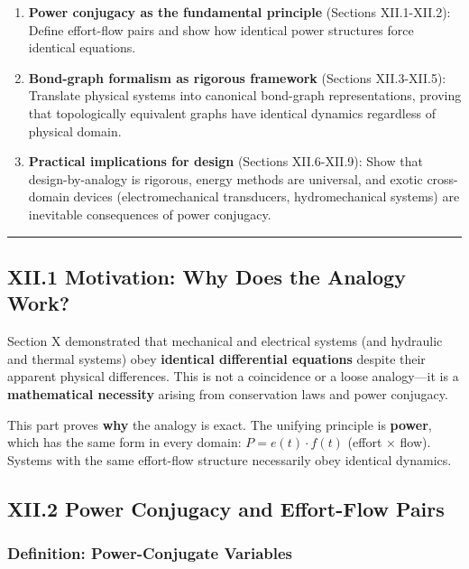 \documentclass[
]{article}
\begin{document}
\begin{enumerate}
\def\labelenumi{\arabic{enumi}.}
\item
  \textbf{Power conjugacy as the fundamental principle} (Sections
  XII.1-XII.2): Define effort-flow pairs and show how identical power
  structures force identical equations.
\item
  \textbf{Bond-graph formalism as rigorous framework} (Sections
  XII.3-XII.5): Translate physical systems into canonical bond-graph
  representations, proving that topologically equivalent graphs have
  identical dynamics regardless of physical domain.
\item
  \textbf{Practical implications for design} (Sections XII.6-XII.9):
  Show that design-by-analogy is rigorous, energy methods are universal,
  and exotic cross-domain devices (electromechanical transducers,
  hydromechanical systems) are inevitable consequences of power
  conjugacy.
\end{enumerate}

\begin{center}\rule{0.5\linewidth}{0.5pt}\end{center}

\subsection{XII.1 Motivation: Why Does the Analogy
Work?}\label{xii.1-motivation-why-does-the-analogy-work}

Section X demonstrated that mechanical and electrical systems (and
hydraulic and thermal systems) obey \textbf{identical differential
equations} despite their apparent physical differences. This is not a
coincidence or a loose analogy---it is a \textbf{mathematical necessity}
arising from conservation laws and power conjugacy.

This part proves \textbf{why} the analogy is exact. The unifying
principle is \textbf{power}, which has the same form in every domain:
\(P = e(t) \cdot f(t)\) (effort × flow). Systems with the same
effort-flow structure necessarily obey identical dynamics.

\subsection{XII.2 Power Conjugacy and Effort-Flow
Pairs}\label{xii.2-power-conjugacy-and-effort-flow-pairs}

\subsubsection{Definition: Power-Conjugate
Variables}\label{definition-power-conjugate-variables}
\end{document}

